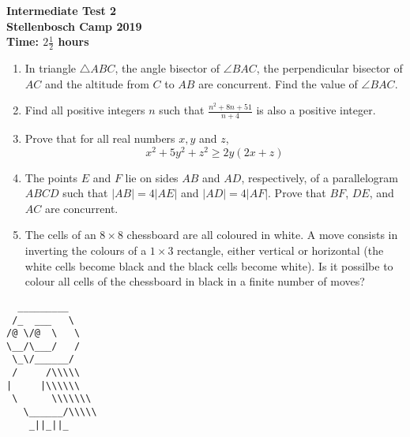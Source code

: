 \documentclass{article}
\begin{document}
\thispagestyle{empty}

\begin{center}
  \textbf{\Large Intermediate Test 2}
  \\ \vspace{1em}
  \textbf{\large Stellenbosch Camp 2019}
  \\ \vspace{1em}
  \textbf{\large Time: $2\frac{1}{2}$ hours}
\end{center}

\vspace{6.81mm}

\begin{enumerate}[1.]

\item %
In triangle $\triangle ABC$, the angle bisector of $\angle BAC$, the perpendicular bisector of $AC$ and the altitude from $C$ to $AB$ are concurrent. Find the value of $\angle BAC$.
\vspace{6.81mm}

\item %
Find all positive integers $n$ such that $\frac{n^2 + 8n + 51}{n + 4}$ is also a positive integer.
\vspace{6.81mm}

\item %
Prove that for all real numbers $x, y$ and $z$,
$$x^2 + 5y^2 + z^2 \ge 2y(2x + z)$$
\vspace{6.81mm}

\item %
The points $E$ and $F$ lie on sides $AB$ and $AD$, respectively, of a parallelogram $ABCD$ such that $|AB| = 4|AE|$ and $|AD| = 4|AF|$.
Prove that $BF$, $DE$, and $AC$ are concurrent.
\vspace{6.81mm}

\item %
The cells of an $8 \times 8$ chessboard are all coloured in white. A move consists in inverting the colours of a $1 \times 3$ rectangle, either vertical or horizontal (the white cells become black and the black cells become white).
Is it possilbe to colour all cells of the chessboard in black in a finite number of moves? 

\end{enumerate}

\vfill
\begin{center}
  \begin{BVerbatim}
  _________
 /_  ___   \
/@ \/@  \   \
\__/\___/   /
 \_\/______/
 /     /\\\\\ 
|     |\\\\\\ 
 \      \\\\\\\ 
   \______/\\\\\
    _||_||_
   
  \end{BVerbatim}
\end{center}
\end{document}
